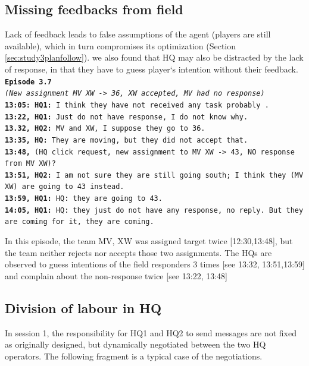 \subsection{Missing feedbacks from field}
Lack of feedback leads to false assumptions of the agent (players are still available), which in turn compromises its optimization (Section \ref{sec:study3planfollow}). we also found that HQ may also be distracted by the lack of response, in that they have to guess player`s intention without their feedback. \\

\noindent\texttt{\textbf{Episode 3.7}\\
\emph{(New assignment MV XW -> 36, XW accepted, MV had no response)}\\
\textbf{13:05: HQ1: } I think they have not received any task probably . \\
\textbf{13:22, HQ1: } Just do not have response, I do not know why.  \\
\textbf{13.32, HQ2: } MV and XW, I suppose they go to 36. \\
\textbf{13:35, HQ: } They are moving, but they did not accept that. \\
\textbf{13:48, } (HQ click request, new assignment to MV XW -> 43, NO response from MV XW)?\\
\textbf{13:51, HQ2: } I am not sure they are still going south; I think they (MV XW) are going to 43 instead. \\
\textbf{13:59, HQ1: } HQ: they are going to 43.\\
\textbf{14:05, HQ1: } HQ: they just do not have any response, no reply. But they are coming for it, they are coming. \\
}

In this episode, the team MV, XW was assigned target twice [12:30,13:48], but the team neither rejects nor accepts those two assignments. The HQs are observed to guess intentions of the field responders 3 times [see 13:32, 13:51,13:59] and complain about the non-response twice [see 13:22, 13:48]

\subsection{Division of labour in HQ}

In session 1, the responsibility for HQ1 and HQ2 to send messages are not fixed as originally designed, but dynamically negotiated between the two HQ operators. The following fragment is a typical case of the negotiations.\\

